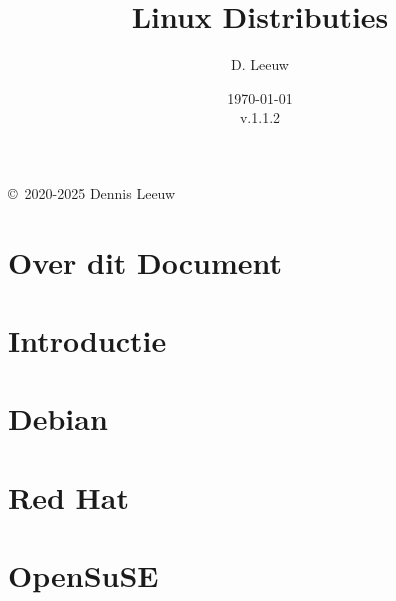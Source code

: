 \documentclass[a4paper,12pt,twoside,openright,titlepage]{book}
\author{D. Leeuw}
\title{Linux Distributies}
\date{\today\\v.1.1.2}
\begin{document}

\maketitle

\copyright\ 2020-2025 Dennis Leeuw\\




\frontmatter
\chapter{Over dit Document}
%
%

\tableofcontents

\mainmatter

\chapter{Introductie}

\chapter{Debian}

\chapter{Red Hat}

\chapter{OpenSuSE}


\backmatter
\printindex
\end{document}
